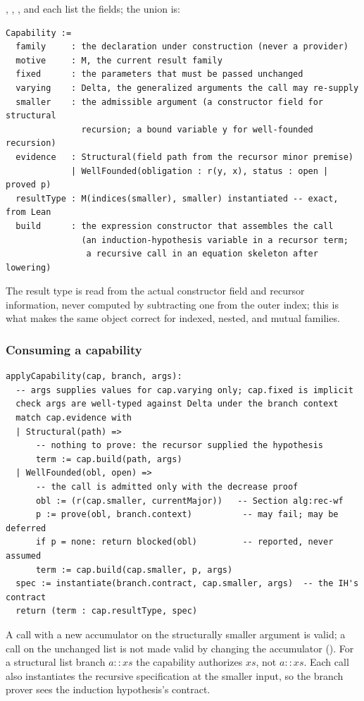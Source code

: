 , , , and  each list the fields; the union is:
\begin{lstlisting}
Capability :=
  family     : the declaration under construction (never a provider)
  motive     : M, the current result family
  fixed      : the parameters that must be passed unchanged
  varying    : Delta, the generalized arguments the call may re-supply
  smaller    : the admissible argument (a constructor field for structural
               recursion; a bound variable y for well-founded recursion)
  evidence   : Structural(field path from the recursor minor premise)
             | WellFounded(obligation : r(y, x), status : open | proved p)
  resultType : M(indices(smaller), smaller) instantiated -- exact, from Lean
  build      : the expression constructor that assembles the call
               (an induction-hypothesis variable in a recursor term;
                a recursive call in an equation skeleton after lowering)
\end{lstlisting}
The result type is read from the actual constructor field and recursor information, never computed by subtracting one from the outer index; this is what makes the same object correct for indexed, nested, and mutual families.

\subsubsection{Consuming a capability}

\begin{lstlisting}
applyCapability(cap, branch, args):
  -- args supplies values for cap.varying only; cap.fixed is implicit
  check args are well-typed against Delta under the branch context
  match cap.evidence with
  | Structural(path) =>
      -- nothing to prove: the recursor supplied the hypothesis
      term := cap.build(path, args)
  | WellFounded(obl, open) =>
      -- the call is admitted only with the decrease proof
      obl := (r(cap.smaller, currentMajor))   -- Section alg:rec-wf
      p := prove(obl, branch.context)          -- may fail; may be deferred
      if p = none: return blocked(obl)         -- reported, never assumed
      term := cap.build(cap.smaller, p, args)
  spec := instantiate(branch.contract, cap.smaller, args)  -- the IH's contract
  return (term : cap.resultType, spec)
\end{lstlisting}
A call with a new accumulator on the structurally smaller argument is valid; a call on the unchanged list is not made valid by changing the accumulator (). For a structural list branch $a{::}xs$ the capability authorizes $xs$, not $a{::}xs$. Each call also instantiates the recursive specification at the smaller input, so the branch prover sees the induction hypothesis's contract.

